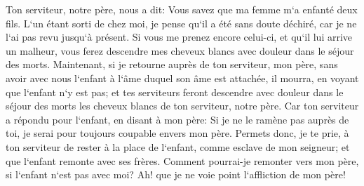 \verse Ton serviteur, notre père, nous a dit: Vous savez que ma femme m`a enfanté deux fils. 
\verse L`un étant sorti de chez moi, je pense qu`il a été sans doute déchiré, car je ne l`ai pas revu jusqu`à présent. 
\verse Si vous me prenez encore celui-ci, et qu`il lui arrive un malheur, vous ferez descendre mes cheveux blancs avec douleur dans le séjour des morts. 
\verse Maintenant, si je retourne auprès de ton serviteur, mon père, sans avoir avec nous l`enfant à l`âme duquel son âme est attachée, 
\verse il mourra, en voyant que l`enfant n`y est pas; et tes serviteurs feront descendre avec douleur dans le séjour des morts les cheveux blancs de ton serviteur, notre père. 
\verse Car ton serviteur a répondu pour l`enfant, en disant à mon père: Si je ne le ramène pas auprès de toi, je serai pour toujours coupable envers mon père. 
\verse Permets donc, je te prie, à ton serviteur de rester à la place de l`enfant, comme esclave de mon seigneur; et que l`enfant remonte avec ses frères. 
\verse Comment pourrai-je remonter vers mon père, si l`enfant n`est pas avec moi? Ah! que je ne voie point l`affliction de mon père! 

